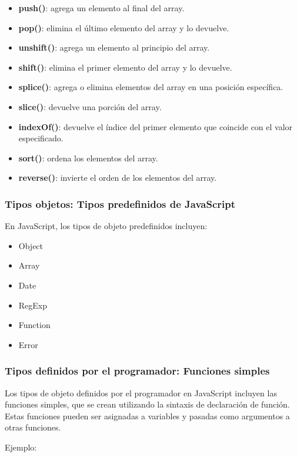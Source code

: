 \documentclass[executivepaper]{article}
\begin{document}
\begin{itemize}
\item \textbf{push()}: agrega un elemento al final del array.
\item \textbf{pop()}: elimina el último elemento del array y lo devuelve.
\item \textbf{unshift()}: agrega un elemento al principio del array.
\item \textbf{shift()}: elimina el primer elemento del array y lo devuelve.
\item \textbf{splice()}: agrega o elimina elementos del array en una posición específica.
\item \textbf{slice()}: devuelve una porción del array.
\item \textbf{indexOf()}: devuelve el índice del primer elemento que coincide con el valor especificado.
\item \textbf{sort()}: ordena los elementos del array.
\item \textbf{reverse()}: invierte el orden de los elementos del array.
\end{itemize}

\subsubsection*{Tipos objetos: Tipos predefinidos de JavaScript}

En JavaScript, los tipos de objeto predefinidos incluyen:

\begin{itemize}
\item Object
\item Array
\item Date
\item RegExp
\item Function
\item Error
\end{itemize}

\subsubsection*{Tipos definidos por el programador: Funciones simples}

Los tipos de objeto definidos por el programador en JavaScript incluyen las funciones simples, que se crean utilizando la sintaxis de declaración de función. Estas funciones pueden ser asignadas a variables y pasadas como argumentos a otras funciones.

Ejemplo:
\end{document}

